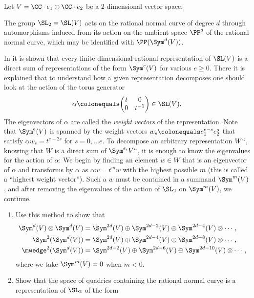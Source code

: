 \begin{exercise}\label{rnc and representations}
Let $V = \CC\cdot e_1\oplus \CC\cdot e_2$ be a 2-dimensional vector space.

The group $\SL_2= \SL (V)$ acts on the
rational normal curve
%
of degree $d$ through automorphisms induced from its action on
%
the ambient space $\PP^d$ of the rational normal curve, which may be identified with $\PP(\Sym^d(V))$.

In \cite[pp.\,146--150]{Fulton-Harris} it is shown that
 every finite-dimen\-sional rational
representation of $\SL(V)$ is a direct sum of representations of the
form $\Sym^e(V)$ for various $e\geq 0$.
There it is explained that to understand how a given representation decomposes one should look at the action of the
torus generator
%
$$
\alpha \colonequals \biggl(\begin{matrix}
t&0\\
0&t^{-1}
\end{matrix}
\biggr)
\in \SL(V).
$$
The eigenvectors of $\alpha$ are called the {\it weight vectors} of the representation.
%
Note that $\Sym^e(V)$ is spanned by the weight vectors
$w_s \colonequals e_1^{e-s} e_2^{s}$
that satisfy $\alpha w_s = t^{e-2s}$ for $s = 0, \dots e$.
To decompose an arbitrary representation $W` `$, knowing that $W$ is a direct sum of $\Sym^{e_i}V` `$, it is enough to know the
eigenvalues for the action of $\alpha$: We begin by finding an element $w\in W$ that
is an eigenvector of $\alpha$ and transforms by $\alpha$ as $\alpha w
= t^mw$ with the highest possible $m$ (this is called a ``highest
weight vector'').
Such a $w$
must be contained
in a summand $\Sym^m(V)$, and after removing the eigenvalues of the action of $\SL_2$ on $\Sym^m(V)$, we continue.
\begin{enumerate}
 \item Use this method to show that
\begin{align*}
 \Sym^d(V)\otimes \Sym^d(V)&= \Sym^{2d}(V) \oplus  \Sym^{2d-2}(V) \oplus \Sym^{2d-4}(V) \otimes\cdots,\\
 \Sym^2(\Sym^d(V))&= \Sym^{2d}(V) \oplus \Sym^{2d-4}(V)\oplus \Sym^{2d-8}(V)\otimes \cdots,\\[-1.5pt]
 \mwedge^2(\Sym^d(V))&= \Sym^{2d-2}(V) \oplus \Sym^{2d-6}(V)\oplus \Sym^{2d-10}(V)\otimes \cdots,
\end{align*}
where we take $\Sym^{m}(V)=0$ when $m<0$.
 \item Show that the space of quadrics containing the rational normal curve is a representation of $\SL_2$ of the form

\end{enumerate}
\end{exercise}
